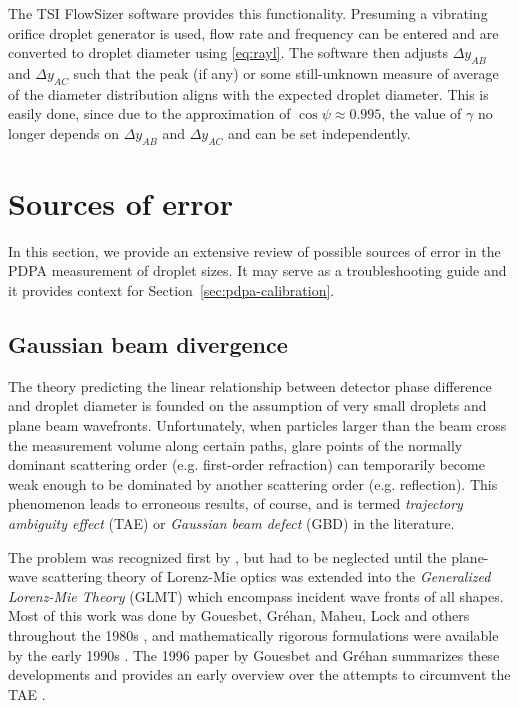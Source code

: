 \documentclass[11.5pt,oneside]{book}
\newcommand*{\secref}[1]{Section~\ref{#1}}
\begin{document}
The TSI FlowSizer software provides this functionality. Presuming a vibrating
orifice droplet generator is used, flow rate and frequency can be entered and
are converted to droplet diameter using \eqref{eq:rayl}. The
software then adjusts $\Delta y_{AB}$ and $\Delta y_{AC}$ such that the peak (if
any) or some still-unknown measure of average of the diameter distribution
aligns with the expected droplet diameter. This is easily done, since due to the
approximation of $\cos \psi \approx 0.995$, the value of $\gamma$ no longer
depends on $\Delta y_{AB}$ and $\Delta y_{AC}$ and can be set independently.


\section{Sources of error}
In this section, we provide an extensive review of possible sources of error in
the PDPA measurement of droplet sizes. It may serve as a troubleshooting guide
and it provides context for \secref{sec:pdpa-calibration}.

\subsection{Gaussian beam divergence}
The theory predicting the linear relationship between detector phase difference
and droplet diameter is founded on the assumption of very small droplets and
plane beam wavefronts. Unfortunately, when particles larger than the beam cross
the measurement volume along certain paths, glare points of the normally
dominant scattering order (e.g. first-order refraction) can temporarily become
weak enough to be dominated by another scattering order (e.g. reflection). This
phenomenon leads to erroneous results, of course, and is termed \emph{trajectory
ambiguity effect} (TAE) or \emph{Gaussian beam defect} (GBD) in the literature.

The problem was recognized first by \citet{Saffman86}, but had to be neglected until
the plane-wave scattering theory of Lorenz-Mie optics was extended into
the \emph{Generalized Lorenz-Mie Theory} (GLMT) which encompass incident wave
fronts of all shapes. Most of this work was
done by Gouesbet, Gréhan, Maheu, Lock and others throughout the 1980s
\cite{Grehan80, Gouesbet82, Gouesbet88, Maheu88}, and mathematically
rigorous formulations were available by the early 1990s \cite{Lock94,
Gouesbet94}. The 1996 paper by Gouesbet and Gréhan summarizes these developments
and provides an early overview over the attempts to circumvent the TAE
\cite{Gouesbet96}. 
\end{document}
